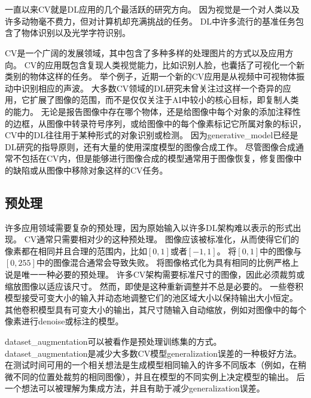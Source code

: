 \section{}
\label{sec:computer_vision}

一直以来\gls{CV}就是\gls{DL}应用的几个最活跃的研究方向。
因为视觉是一个对人类以及许多动物毫不费力，但对计算机却充满挑战的任务\citep{ballard1983parallel}。
\gls{DL}中许多流行的基准任务包含了物体识别以及光学字符识别。


\gls{CV}是一个广阔的发展领域，其中包含了多种多样的处理图片的方式以及应用方向。
\gls{CV}的应用既包含复现人类视觉能力，比如识别人脸，也囊括了可视化一个新类别的物体这样的任务。
举个例子，近期一个新的\gls{CV}应用是从视频中可视物体振动中识别相应的声波\citep{Davis2014VisualMic}。
大多数\gls{CV}领域的\gls{DL}研究未曾关注过这样一个奇异的应用，它扩展了图像的范围，而不是仅仅关注于\gls{AI}中较小的核心目标，即复制人类的能力。
无论是报告图像中存在哪个物体，还是给图像中每个对象的添加注释性的边框，从图像中转录符号序列，或给图像中的每个像素标记它所属对象的标识，\gls{CV}中的\gls{DL}往往用于某种形式的对象识别或检测。
因为\gls{generative_model}已经是\gls{DL}研究的指导原则，还有大量的使用深度模型的图像合成工作。
尽管图像合成通常不包括在\gls{CV}内，但是能够进行图像合成的模型通常用于图像恢复，修复图像中的缺陷或从图像中移除对象这样的\gls{CV}任务。

\subsection{预处理}
\label{sec:preprocessing}

许多应用领域需要复杂的预处理，因为原始输入以许多\gls{DL}架构难以表示的形式出现。
\gls{CV}通常只需要相对少的这种预处理。
图像应该被标准化，从而使得它们的像素都在相同并且合理的范围内，比如$[0,1]$或者$[-1,1]$。
将$[0,1]$中的图像与$[0,255]$中的图像混合通常会导致失败。
将图像格式化为具有相同的比例严格上说是唯一一种必要的预处理。
许多\gls{CV}架构需要标准尺寸的图像，因此必须裁剪或缩放图像以适应该尺寸。
然而，即使是这种重新调整并不总是必要的。
一些卷积模型接受可变大小的输入并动态地调整它们的池区域大小以保持输出大小恒定\citep{Waibel89b}。
其他卷积模型具有可变大小的输出，其尺寸随输入自动缩放，例如对图像中的每个像素进行\gls{denoise}或标注的模型\citep{Hadsell-RSS-07}。

\gls{dataset_augmentation}可以被看作是预处理训练集的方式。
\gls{dataset_augmentation}是减少大多数\gls{CV}模型\gls{generalization}误差的一种极好方法。
在测试时间可用的一个相关想法是生成模型相同输入的许多不同版本（例如，在稍微不同的位置处裁剪的相同图像），并且在模型的不同实例上决定模型的输出。
后一个想法可以被理解为集成方法，并且有助于减少\gls{generalization}误差。


